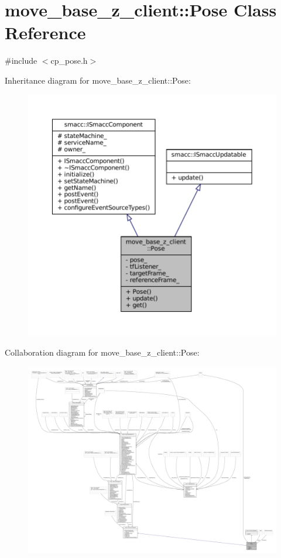\hypertarget{classmove__base__z__client_1_1Pose}{}\section{move\+\_\+base\+\_\+z\+\_\+client\+:\+:Pose Class Reference}
\label{classmove__base__z__client_1_1Pose}


{\ttfamily \#include $<$cp\+\_\+pose.\+h$>$}



Inheritance diagram for move\+\_\+base\+\_\+z\+\_\+client\+:\+:Pose\+:
\nopagebreak
\begin{figure}[H]
\begin{center}
\leavevmode
\includegraphics[width=350pt]{classmove__base__z__client_1_1Pose__inherit__graph}
\end{center}
\end{figure}


Collaboration diagram for move\+\_\+base\+\_\+z\+\_\+client\+:\+:Pose\+:
\nopagebreak
\begin{figure}[H]
\begin{center}
\leavevmode
\includegraphics[width=350pt]{classmove__base__z__client_1_1Pose__coll__graph}
\end{center}
\end{figure}
